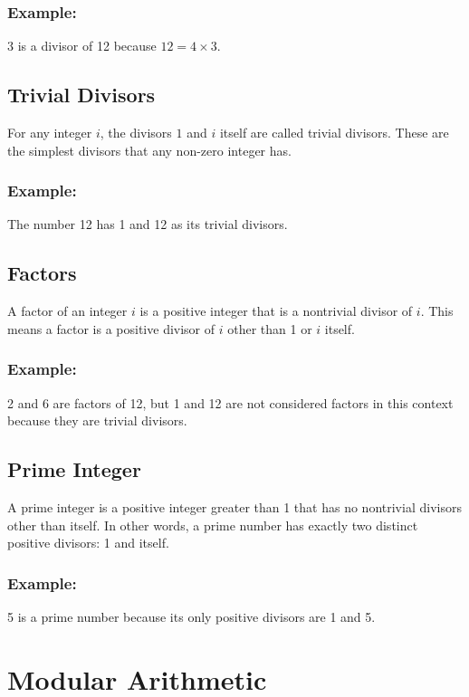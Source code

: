 \documentclass[11pt, letterpaper]{article}
\begin{document}
\subsubsection*{Example:} 
3 is a divisor of 12 because \( 12 = 4 \times 3 \).

\subsection{Trivial Divisors}
For any integer \( i \), the divisors \( 1 \) and \( i \) itself are called trivial divisors. These are the simplest divisors that any non-zero integer has.

\subsubsection*{Example:} 
The number 12 has 1 and 12 as its trivial divisors.

\subsection{Factors}
A factor of an integer \( i \) is a positive integer that is a nontrivial divisor of \( i \). This means a factor is a positive divisor of \( i \) other than 1 or \( i \) itself.

\subsubsection*{Example:} 
2 and 6 are factors of 12, but 1 and 12 are not considered factors in this context because they are trivial divisors.

\subsection{Prime Integer}
A prime integer is a positive integer greater than 1 that has no nontrivial divisors other than itself. In other words, a prime number has exactly two distinct positive divisors: 1 and itself.

\subsubsection*{Example:} 
5 is a prime number because its only positive divisors are 1 and 5.







\section{Modular Arithmetic}
\end{document}
